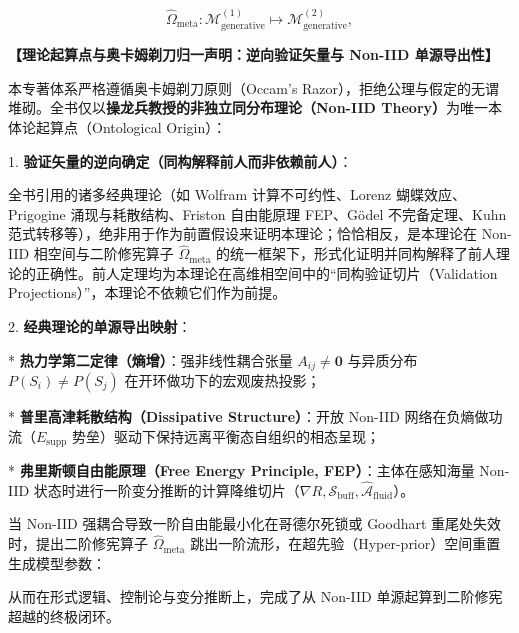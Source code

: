 \documentclass[11pt,a4paper,oneside]{ctexart}
\begin{document}
\begin{equation}
\hat{\Omega}_{\text{meta}}: \mathcal{M}_{\text{generative}}^{(1)} \mapsto \mathcal{M}_{\text{generative}}^{(2)},
\end{equation}

\begin{notebox}
[!IMPORTANT]

\textbf{【理论起算点与奥卡姆剃刀归一声明：逆向验证矢量与 Non-IID 单源导出性】}

本专著体系严格遵循奥卡姆剃刀原则（Occam's Razor），拒绝公理与假定的无谓堆砌。全书仅以\textbf{操龙兵教授的非独立同分布理论（Non-IID Theory）}为唯一本体论起算点（Ontological Origin）：

1. \textbf{验证矢量的逆向确定（同构解释前人而非依赖前人）}：

全书引用的诸多经典理论（如 Wolfram 计算不可约性、Lorenz 蝴蝶效应、Prigogine 涌现与耗散结构、Friston 自由能原理 FEP、Gödel 不完备定理、Kuhn 范式转移等），\textit{}绝非用于作为前置假设来证明本理论；恰恰相反，是本理论在 Non-IID 相空间与二阶修宪算子 $\hat{\Omega}_{\text{meta}}$ 的统一框架下，形式化证明并同构解释了前人理论的正确性\textit{}。前人定理均为本理论在高维相空间中的“同构验证切片（Validation Projections）”，本理论不依赖它们作为前提。

2. \textbf{经典理论的单源导出映射}：

* \textbf{热力学第二定律（熵增）}：强非线性耦合张量 $A_{ij} \neq \mathbf{0}$ 与异质分布 $P(S_i) \neq P(S_j)$ 在开环做功下的宏观废热投影；

* \textbf{普里高津耗散结构（Dissipative Structure）}：开放 Non-IID 网络在负熵做功流（$E_{\text{supp}}$ 势垒）驱动下保持远离平衡态自组织的相态呈现；

* \textbf{弗里斯顿自由能原理（Free Energy Principle, FEP）}：主体在感知海量 Non-IID 状态时进行一阶变分推断的计算降维切片（$\nabla R, \mathcal{S}_{\text{buff}}, \hat{\mathcal{A}}_{\text{fluid}}$）。

当 Non-IID 强耦合导致一阶自由能最小化在哥德尔死锁或 Goodhart 重尾处失效时，提出\textit{}二阶修宪算子 $\hat{\Omega}_{\text{meta}}$\textit{} 跳出一阶流形，在超先验（Hyper-prior）空间重置生成模型参数：

从而在形式逻辑、控制论与变分推断上，完成了从 Non-IID 单源起算到二阶修宪超越的终极闭环。
\end{notebox}
\end{document}
